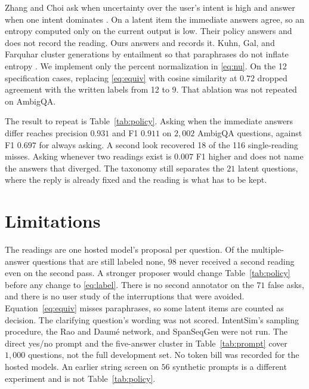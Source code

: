 \documentclass[journal]{IEEEtran}
\begin{document}
Zhang and Choi ask when uncertainty over the user's intent is high and answer when one intent dominates \cite{zhang-choi-2025-clarify}.
On a latent item the immediate answers agree, so an entropy computed only on the current output is low.
Their policy answers and does not record the reading.
Ours answers and records it.
Kuhn, Gal, and Farquhar cluster generations by entailment so that paraphrases do not inflate entropy \cite{kuhn-etal-2023-semantic}.
We implement only the percent normalization in \eqref{eq:nu}.
On the 12 specification cases, replacing \eqref{eq:equiv} with cosine similarity at $0.72$ dropped agreement with the written labels from 12 to 9.
That ablation was not repeated on AmbigQA.

The result to repeat is Table~\ref{tab:policy}.
Asking when the immediate answers differ reaches precision $0.931$ and F1 $0.911$ on $2{,}002$ AmbigQA questions, against F1 $0.697$ for always asking.
A second look recovered 18 of the 116 single-reading misses.
Asking whenever two readings exist is $0.007$ F1 higher and does not name the answers that diverged.
The taxonomy still separates the $21$ latent questions, where the reply is already fixed and the reading is what has to be kept.

\section{Limitations}
\label{sec:limits}
The readings are one hosted model's proposal per question.
Of the multiple-answer questions that are still labeled none, $98$ never received a second reading even on the second pass.
A stronger proposer would change Table~\ref{tab:policy} before any change to \eqref{eq:label}.
There is no second annotator on the $71$ false asks, and there is no user study of the interruptions that were avoided.
Equation~\eqref{eq:equiv} misses paraphrases, so some latent items are counted as decision.
The clarifying question's wording was not scored.
IntentSim's sampling procedure, the Rao and Daum\'e network, and SpanSeqGen were not run.
The direct yes/no prompt and the five-answer cluster in Table~\ref{tab:prompt} cover $1{,}000$ questions, not the full development set.
No token bill was recorded for the hosted models.
An earlier string screen on $56$ synthetic prompts is a different experiment and is not Table~\ref{tab:policy}.
\end{document}

